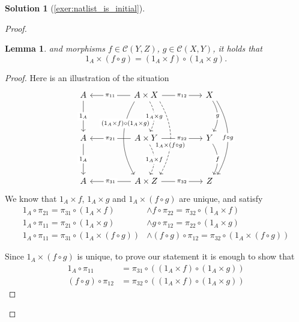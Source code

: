 \documentclass[a4paper,11pt, oneside,titlepage=false]{scrbook}
\theoremstyle{plain}
\newtheorem{lemma}[thm]{Lemma}
\theoremstyle{definition}
\newtheorem{solution}[thm]{Solution}
\newcommand{\Cat}[1]{\mathcal{#1}}
\newcommand{\CC}{\Cat{C}}
\begin{document}
\begin{solution}[\cref{exer:natlist_is_initial}]
\begin{proof}
\begin{lemma}
				and morphisms $f \in \CC(Y, Z)$, $g \in \CC(X, Y)$,
				it holds that
				\[
					1_A \times (f \circ g) = (1_A \times f) \circ (1_A \times g).
				\]
			\end{lemma}
			\begin{proof}
				Here is an illustration of the situation
				\[
					\begin{tikzcd}
						A && {A \times X} && X \\
						\\
						A && {A \times Y} && Y \\
						\\
						A && {A \times Z} && Z
						\arrow["{1_A}"{description}, from=1-1, to=3-1]
						\arrow["{1_A}"{description}, from=3-1, to=5-1]
						\arrow["g"{description}, bend left, from=1-5, to=3-5]
						\arrow["f"{description}, bend left, from=3-5, to=5-5]
						\arrow["{f \circ g}"{description}, bend left, shift left=2, from=1-5, to=5-5]
						\arrow["\pi_{11}"{description},from=1-3, to=1-1]
						\arrow["\pi_{12}"{description},from=1-3, to=1-5]
						\arrow["\pi_{21}"{description},from=3-3, to=3-1]
						\arrow["\pi_{22}"{description},from=3-3, to=3-5]
						\arrow["\pi_{31}"{description},from=5-3, to=5-1]
						\arrow["\pi_{32}"{description},from=5-3, to=5-5]
						\arrow["{1_A \times g}"{description}, bend left, dashed, from=1-3, to=3-3]
						\arrow["{1_A \times f}"{description}, bend left, dashed, from=3-3, to=5-3]
						\arrow["{1_A \times (f \circ g)}"{description, pos=0.6}, bend left, shift left=5, dashed, from=1-3, to=5-3]
						\arrow["{(1_A \times f) \circ (1_A \times g)}"{description, pos=0.3}, shift right=4, bend right, from=1-3, to=5-3]
					\end{tikzcd}
				\]
				We know that $1_A \times f$, $1_A \times g$ and $1_A \times (f \circ g)$ are unique, and satisfy
				\begin{align}
					1_A \circ \pi_{21} = \pi_{31} \circ (1_A \times f)           & \wedge f \circ \pi_{22} = \pi_{32} \circ (1_A \times f) \label{Hf}          \\
					1_A \circ \pi_{11} = \pi_{21} \circ (1_A \times g)           & \wedge g \circ \pi_{12} = \pi_{22} \circ (1_A \times g) \label{Hg}          \\
					1_A \circ \pi_{11} = \pi_{31} \circ (1_A \times (f \circ g)) & \wedge (f \circ g) \circ \pi_{12} = \pi_{32} \circ (1_A \times (f \circ g))
				\end{align}

				Since $1_A \times (f \circ g)$ is unique, to prove our statement it is enough to show that
				\begin{align}
					1_A \circ \pi_{11}         & = \pi_{31} \circ ((1_A \times f) \circ (1_A \times g)) \label{goal:left}  \\
					(f \circ g) \circ \pi_{12} & = \pi_{32} \circ ((1_A \times f) \circ (1_A \times g)) \label{goal:right}
				\end{align}


\end{proof}
\end{proof}
\end{solution}
\end{document}
